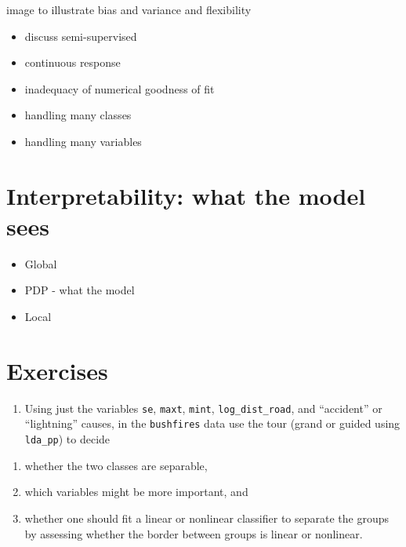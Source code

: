 \documentclass[
  letterpaper,
]{krantz}
\providecommand{\tightlist}{%
  \setlength{\itemsep}{0pt}\setlength{\parskip}{0pt}}\usepackage{longtable,booktabs,array}
\begin{document}
image to illustrate bias and variance and flexibility

\begin{itemize}
\tightlist
\item
  discuss semi-supervised
\item
  continuous response
\item
  inadequacy of numerical goodness of fit
\item
  handling many classes
\item
  handling many variables
\end{itemize}

\section{Interpretability: what the model
sees}\label{interpretability-what-the-model-sees}

\begin{itemize}
\tightlist
\item
  Global
\item
  PDP - what the model
\item
  Local
\end{itemize}

  

\section*{Exercises}\label{exercises-12}


\begin{enumerate}
\def\labelenumi{\arabic{enumi}.}
\tightlist
\item
  Using just the variables \texttt{se}, \texttt{maxt}, \texttt{mint},
  \texttt{log\_dist\_road}, and ``accident'' or ``lightning'' causes, in
  the \texttt{bushfires} data use the tour (grand or guided using
  \texttt{lda\_pp}) to decide
\end{enumerate}

\begin{enumerate}
\def\labelenumi{\alph{enumi}.}
\tightlist
\item
  whether the two classes are separable,
\item
  which variables might be more important, and
\item
  whether one should fit a linear or nonlinear classifier to separate
  the groups by assessing whether the border between groups is linear or
  nonlinear.
\end{enumerate}
\end{document}
